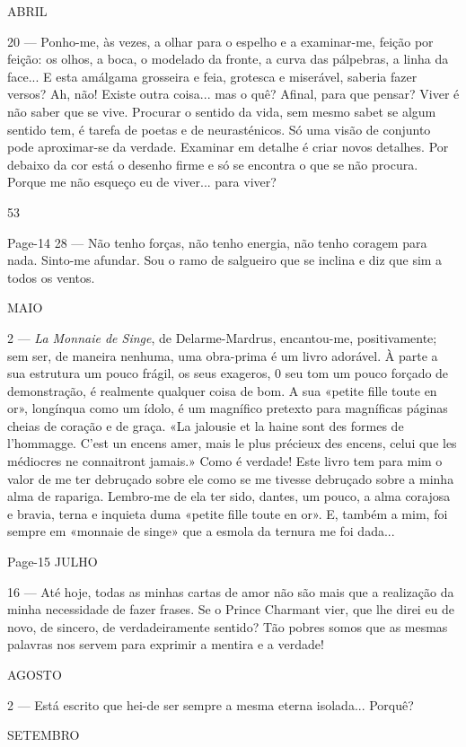 ABRIL

20 — Ponho-me, às vezes, a olhar para o espelho e a
examinar-me, feição por feição: os olhos, a boca, o 
modelado da fronte, a curva das pálpebras, a linha da face...
E esta amálgama grosseira e feia, grotesca e miserável,
saberia fazer versos? Ah, não! Existe outra coisa...
mas o quê? Afinal, para que pensar? Viver é não saber
que se vive. Procurar o sentido da vida, sem mesmo
sabet se algum sentido tem, é tarefa de poetas e de
neurasténicos. Só uma visão de conjunto pode 
aproximar-se da verdade. Examinar em detalhe é criar novos
detalhes. Por debaixo da cor está o desenho firme e só
se encontra o que se não procura. Porque me não
esqueço eu de viver... para viver?

53


Page-14
28 — Não tenho forças, não tenho energia, não tenho
coragem para nada. Sinto-me afundar. Sou o ramo de
salgueiro que se inclina e diz que sim a todos os
ventos.

MAIO

2 — \textit{La Monnaie de Singe}, de Delarme-Mardrus,
encantou-me, positivamente; sem ser, de maneira 
nenhuma, uma obra-prima é um livro adorável. À parte a
sua estrutura um pouco frágil, os seus exageros, 0 seu
tom um pouco forçado de demonstração, é realmente
qualquer coisa de bom. A sua «petite fille toute en or»,
longínqua como um ídolo, é um magnífico pretexto para
magníficas páginas cheias de coração e de graça. «La
jalousie et la haine sont des formes de l’hommagge.
C’est un encens amer, mais le plus précieux des encens,
celui que les médiocres ne connaitront jamais.» Como
é verdade! Este livro tem para mim o valor de me ter
debruçado sobre ele como se me tivesse debruçado sobre
a minha alma de rapariga. Lembro-me de ela ter sido,
dantes, um pouco, a alma corajosa e bravia, terna e
inquieta duma «petite fille toute en or». E, também a
mim, foi sempre em «monnaie de singe» que a esmola
da ternura me foi dada...

Page-15
JULHO

16 — Até hoje, todas as minhas cartas de amor não
são mais que a realização da minha necessidade de fazer
frases. Se o Prince Charmant vier, que lhe direi eu
de novo, de sincero, de verdadeiramente sentido? Tão
pobres somos que as mesmas palavras nos servem para
exprimir a mentira e a verdade!

AGOSTO

2 — Está escrito que hei-de ser sempre a mesma eterna
isolada... Porquê?

SETEMBRO

